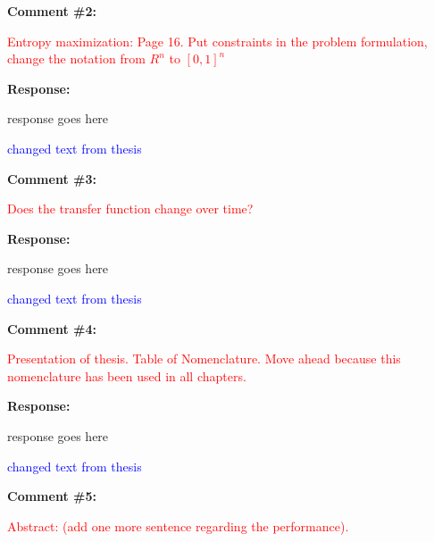 \documentclass[journal]{IEEEtran}
\begin{document}
\vspace{30pt}
\textbf{Comment \#2:}
\begin{adjustwidth}{2.5em}{0pt}
\singlespacing \vspace{-10pt}
\textcolor{red}{Entropy maximization: Page 16. Put constraints in the problem formulation, change the notation from $R^n$ to $[0,1]^n$}
\end{adjustwidth}

\vspace{10pt}
\textbf{Response:}
\begin{adjustwidth}{2.5em}{0pt}
response goes here

\vspace{10pt}
\noindent\textcolor{blue}{changed text from thesis}
\end{adjustwidth}


\vspace{30pt}
\textbf{Comment \#3:}
\begin{adjustwidth}{2.5em}{0pt}
\singlespacing \vspace{-10pt}
\textcolor{red}{Does the transfer function change over time? }
\end{adjustwidth}

\vspace{10pt}
\textbf{Response:}
\begin{adjustwidth}{2.5em}{0pt}
response goes here

\vspace{10pt}
\noindent\textcolor{blue}{changed text from thesis}
\end{adjustwidth}


\vspace{30pt}
\textbf{Comment \#4:}
\begin{adjustwidth}{2.5em}{0pt}
\singlespacing \vspace{-10pt}
\textcolor{red}{Presentation of thesis. Table of Nomenclature. Move ahead because this nomenclature has been used in all chapters.}
\end{adjustwidth}

\vspace{10pt}
\textbf{Response:}
\begin{adjustwidth}{2.5em}{0pt}
response goes here

\vspace{10pt}
\noindent\textcolor{blue}{changed text from thesis}
\end{adjustwidth}


\vspace{30pt}
\textbf{Comment \#5:}
\begin{adjustwidth}{2.5em}{0pt}
\singlespacing \vspace{-10pt}
\textcolor{red}{Abstract: (add one more sentence regarding the performance).}
\end{adjustwidth}
\end{document}
